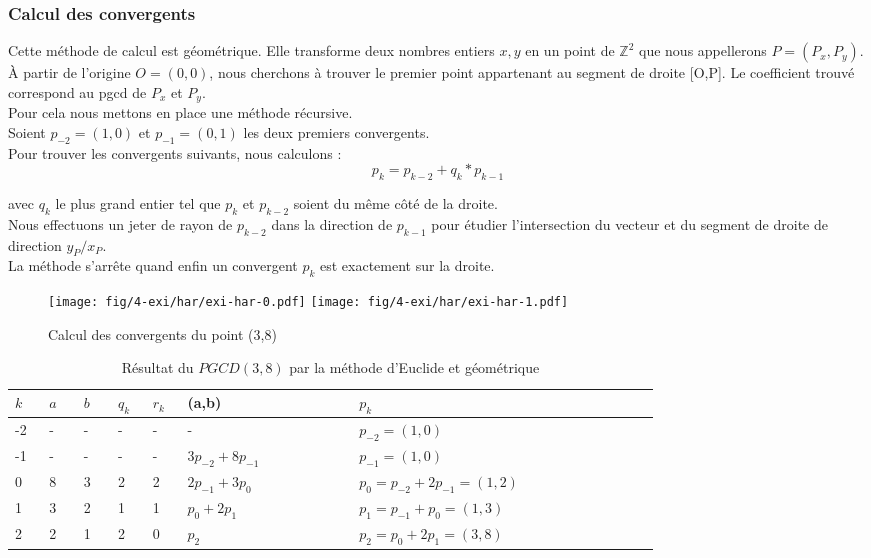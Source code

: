 \subsubsection{Calcul des convergents}

Cette méthode de calcul est géométrique. Elle transforme deux nombres entiers $x, y$ en un point de $\mathbb{Z}^{2}$ que nous appellerons $P = (P_x, P_y)$. À partir de l’origine $O=(0,0)$, nous cherchons à trouver le premier point appartenant au segment de droite [O,P]. Le coefficient trouvé correspond au pgcd de $P_x$ et $P_y$.\\

Pour cela nous mettons en place une méthode récursive.\\
Soient $p_{-2} = (1,0)$ et $p_{-1} = (0,1)$ les deux premiers convergents.\\

Pour trouver les convergents suivants, nous calculons :
$$p_{k} = p_{k-2} + q_k * p_{k-1}$$

avec $q_k$ le plus grand entier tel que $p_{k}$ et $p_{k-2}$ soient du même côté de la droite.\\

Nous effectuons un jeter de rayon de $p_{k-2}$ dans la direction de $p_{k-1}$ pour étudier l’intersection du vecteur et du segment de droite de direction $y_P / x_P$.\\

La méthode s’arrête quand enfin un convergent $p_{k}$ est exactement sur la droite.


\begin{figure}[H]
  \centering
  \texttt{[image: fig/4-exi/har/exi-har-0.pdf]}
  \texttt{[image: fig/4-exi/har/exi-har-1.pdf]}
  \caption{Calcul des convergents du point (3,8)}
\end{figure}


\begin{table}[H]
  \centering
  \begin{tabular}{|p{0.04\linewidth}|p{0.04\linewidth}|p{0.04\linewidth}||p{0.04\linewidth}|p{0.04\linewidth}||p{0.2\linewidth}||p{0.35\linewidth}|}
    \hline 
    $k$ & $a$ & $b$ & $q_{k}$ & $r_k$ & (a,b) & $p_k$ \\
    \hline 
    -2 & - & - & - & - & -                    & $p_{-2} = (1,0)$\\
    -1 & - & - & - & - & $3 p_{-2} + 8p_{-1}$ & $p_{-1} = (1,0)$\\
     0 & 8 & 3 & 2 & 2 & $2 p_{-1} + 3p_{0}$  & $p_{0}  = p_{-2} + 2p_{-1} = (1,2)$\\ 
     1 & 3 & 2 & 1 & 1 & $p_{0}  + 2p_{1}$    & $p_{1}  = p_{-1} + p_{0} = (1,3)$\\
     2 & 2 & 1 & 2 & 0 & $p_{2}$              & $p_{2}  = p_{0} + 2p_{1} = (3,8)$\\
    \hline
  \end{tabular} 
  \caption{Résultat du $PGCD(3,8)$ par la méthode d'Euclide et géométrique}
\end{table}


